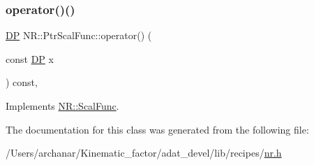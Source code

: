 \mbox{\label{classNR_1_1PtrScalFunc_a661b2194b67e1e0e0de15389f0cea5f1}} 
\subsubsection{\texorpdfstring{operator()()}{operator()()}\hspace{0.1cm}{\footnotesize\ttfamily [2/2]}}
{\footnotesize\ttfamily \mbox{\hyperlink{namespaceNR_af6ff762dd605ff477b8e52387253a02a}{DP}} N\+R\+::\+Ptr\+Scal\+Func\+::operator() (\begin{DoxyParamCaption}\item[{const \mbox{\hyperlink{namespaceNR_af6ff762dd605ff477b8e52387253a02a}{DP}}}]{x }\end{DoxyParamCaption}) const\hspace{0.3cm}{\ttfamily [inline]}, {\ttfamily [virtual]}}



Implements \mbox{\hyperlink{classNR_1_1ScalFunc_a7dae30ac413c03bb0acfae13b7abb57e}{N\+R\+::\+Scal\+Func}}.



The documentation for this class was generated from the following file\+:\begin{DoxyCompactItemize}
\item 
/\+Users/archanar/\+Kinematic\+\_\+factor/adat\+\_\+devel/lib/recipes/\mbox{\hyperlink{lib_2recipes_2nr_8h}{nr.\+h}}\end{DoxyCompactItemize}
